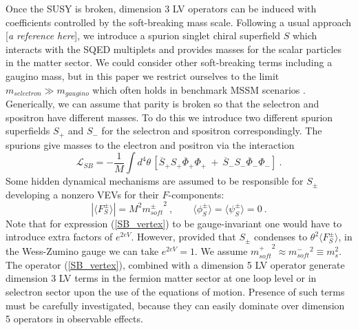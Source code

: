 \documentclass[12pt]{revtex4}
\begin{document}
Once the SUSY is broken, dimension 3 LV operators can be induced 
with coefficients controlled by the soft-breaking mass scale. 
Following a usual approach [{\it a reference here}],
we introduce a spurion singlet
chiral superfield $ S $ which interacts with the SQED
multiplets and provides masses for the scalar particles
in the matter sector. We could consider other  
    soft-breaking terms including a gaugino mass, but in this paper we restrict
ourselves to the limit  $ m_{selectron} \gg m_{gaugino}$ which often holds in 
benchmark MSSM scenarios \cite{benchmark}.
Generically, we can assume that parity is broken so that
the selectron and spositron have different masses.
To do this we introduce two different
spurion superfields $ S_+ $ and $ S_- $
for the selectron and spositron correspondingly.
The spurions give masses to the electron and positron
via the interaction
\begin{equation}
\label{SB_vertex}
  \mathcal{L}_{SB} = - \frac{1}{M} \int d^4\theta \, 
\left[\overline{S}_+ S_+ \overline{\Phi}_+ \Phi_+ 
~+~
\overline{S}_- S_- \overline{\Phi}_- \Phi_-
\right] 
~.
\end{equation}
Some hidden dynamical mechanisms are assumed to be responsible 
    for  $ S_\pm $ developing a 
nonzero VEVs for their $ F $-components:
\[
\left | \langle F^\pm_S \rangle \right | =
M^2 {m^\pm_{soft}}^2~,\qquad 
\langle\phi_S^\pm\rangle = 
\langle\psi_S^\pm\rangle = 0~.
\]
Note that for expression (\ref{SB_vertex}) to be 
gauge-invariant one would have to introduce extra factors
of $ e^{2eV} $. 
However, provided that $ S_\pm $ condenses to 
$ \theta^2 \langle F^\pm_S \rangle $,
in the Wess-Zumino gauge we can take $e^{2eV}=1$.
We assume 
$ {m_{soft}^+}^2 \approx {m_{soft}^-}^2 \equiv m_s^2 $.
The operator (\ref{SB_vertex}), 
combined with a dimension 5 LV operator
generate dimension 3 LV terms in the fermion matter sector at one loop level or 
 in selectron sector upon the use 
    of the equations of motion. 
Presence of such terms must be carefully investigated, 
because  they can easily dominate over dimension 5 operators
in observable effects.
\end{document}

